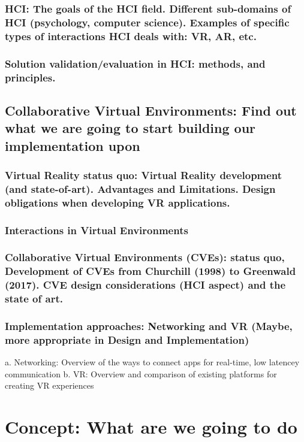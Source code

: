 \subsection{HCI: The goals of the HCI field. Different sub-domains of HCI (psychology, computer science). Examples of specific types of interactions HCI deals with: VR, AR, etc.}
\subsection{Solution validation/evaluation in HCI: methods, and principles.}

\section{Collaborative Virtual Environments: Find out what we are going to start building our implementation upon}
\subsection{Virtual Reality status quo: Virtual Reality development (and state-of-art). Advantages and Limitations.  Design obligations when developing VR applications. }
\subsection{Interactions in Virtual Environments}
\subsection{Collaborative Virtual Environments (CVEs): status quo, Development of CVEs from Churchill (1998) to Greenwald (2017). CVE design considerations (HCI aspect) and the state of art.}
\subsection{Implementation approaches: Networking and VR (Maybe, more appropriate in Design and Implementation)}
a. Networking: Overview of the ways to connect apps for real-time, low latencey communication
b. VR: Overview and comparison of existing platforms for creating VR experiences


\begin{comment}
Methodology: approach to solving the problem; chosen HCI methodology for the final evaluation - no idea
a. Chosen HCI evaluation methodology
\end{comment}


\chapter{Concept: What are we going to do}
